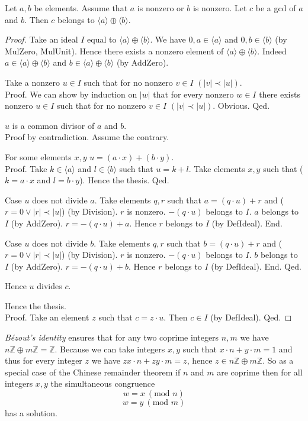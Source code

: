 \documentclass{article}
\renewcommand{\mod}{\text{mod }}
\newcommand{\Int}{\mathbb{Z}}
\begin{document}
  \begin{forthel}
    \begin{theorem}[GCDin]
      Let $a,b$ be elements. Assume that $a$ is nonzero or $b$ is nonzero. Let $c$ be a gcd of $a$ and $b$. Then $c$ belongs to $\langle a \rangle \oplus \langle b \rangle$.
    \end{theorem}
    \begin{proof}
      Take an ideal $I$ equal to $\langle a \rangle \oplus \langle b \rangle$. We have $0,a \in \langle a \rangle$ and $0,b \in \langle b \rangle$ (by MulZero, MulUnit). Hence there exists a nonzero element of $\langle a \rangle \oplus \langle b \rangle$. Indeed $a \in \langle a \rangle \oplus \langle b \rangle$ and $b \in \langle a \rangle \oplus \langle b \rangle$ (by AddZero).

      Take a nonzero $u \in I$ such that for no nonzero $v \in I$ $(|v| \prec |u|)$. \\
      Proof.
        We can show by induction on $|w|$ that for every nonzero $w \in I$ there
          exists nonzero $u \in I$ such that for no nonzero $v \in I$ $(|v| \prec |u|)$.
        Obvious.
      Qed.

      $u$ is a common divisor of $a$ and $b$. \\
      Proof by contradiction.
        Assume the contrary.

        For some elements $x,y$ $u = (a \cdot x) + (b \cdot y)$. \\
        Proof.
          Take $k \in \langle a \rangle$ and $l \in \langle b \rangle$ such that $u = k + l$. Take elements $x,y$ such that ($k = a \cdot x$ and $l = b \cdot y$). Hence the thesis.
        Qed.

        Case $u$ does not divide $a$.
          Take elements $q,r$ such that $a = (q \cdot u) + r$ and ($r = 0 \vee |r| \prec |u|$) (by Division). $r$ is nonzero. $- (q \cdot u)$ belongs to $I$. $a$ belongs to $I$ (by AddZero). $r = - (q \cdot u) + a$. Hence $r$ belongs to $I$ (by DefIdeal).
        End.

        Case $u$ does not divide $b$.
          Take elements $q,r$ such that $b = (q \cdot u) + r$ and ($r = 0 \vee |r| \prec |u|$) (by Division). $r$ is nonzero. $- (q \cdot u)$ belongs to $I$. $b$ belongs to $I$ (by AddZero). $r = - (q \cdot u) + b$. Hence $r$ belongs to $I$ (by DefIdeal).
        End.
      Qed.

      Hence $u$ divides $c$.

      Hence the thesis. \\
      Proof.
        Take an element $z$ such that $c = z \cdot u$. Then $c \in I$ (by DefIdeal).
      Qed.
    \end{proof}
  \end{forthel}

  \textit{Bézout's identity} ensures that for any two coprime integers $n,m$ we have $n \Int \oplus m \Int = \Int$. Because we can take integers $x,y$ such that $x \cdot n + y \cdot m = 1$ and thus for every integer $z$ we have $zx \cdot n + zy \cdot m = z$, hence $z \in n \Int \oplus m \Int$. So as a special case of the Chinese remainder theorem if $n$ and $m$ are coprime then for all integers $x,y$ the simultaneous congruence
  $$w = x ~(\mod n)$$
  $$w = y ~(\mod m)$$
  has a solution.
\end{document}
